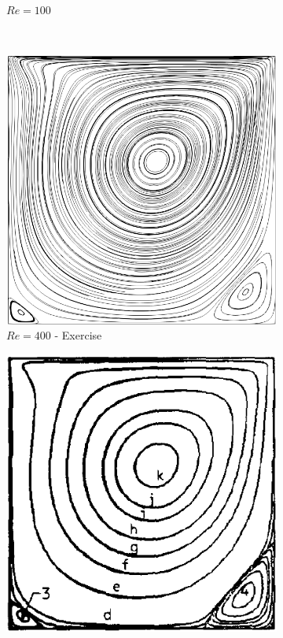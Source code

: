 \begin{figure}[H]
\begin{subfigure}[t]{0.441\textwidth}
        \caption*{$Re = 100$ \parencite{ghia_1982}}
    \end{subfigure}
    \\  %
    \begin{subfigure}[t]{0.450\textwidth}
        \includegraphics[width=\textwidth]{images/Sub-figures_Example/cavity_400_streamlines.png}
        \caption*{$Re = 400$ - Exercise}
    \end{subfigure}
    \begin{subfigure}[t]{0.438\textwidth}
        \includegraphics[width=\textwidth]{images/Sub-figures_Example/cavity_400_streamlines_ghia.png}

\end{subfigure}
\end{figure}

